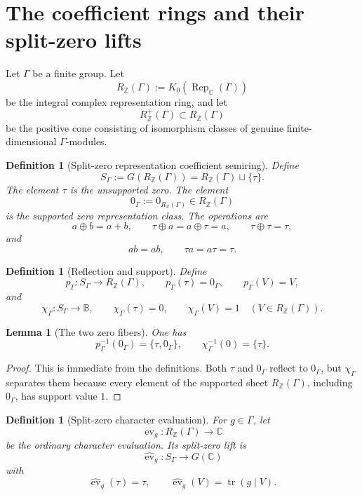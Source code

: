 \documentclass[11pt]{article}
\newtheorem{lemma}[theorem]{Lemma}
\newtheorem{definition}[theorem]{Definition}
\newcommand{\ZZ}{\mathbb Z}
\newcommand{\CC}{\mathbb C}
\newcommand{\BB}{\mathbb B}
\newcommand{\Rep}{\operatorname{Rep}}
\newcommand{\tr}{\operatorname{tr}}
\newcommand{\ev}{\operatorname{ev}}
\begin{document}
\section{The coefficient rings and their split-zero lifts}

Let \(\Gamma\) be a finite group.  Let
\[
R_\ZZ(\Gamma):=K_0(\Rep_\CC(\Gamma))
\]
be the integral complex representation ring, and let
\[
R_\ZZ^+(\Gamma)\subset R_\ZZ(\Gamma)
\]
be the positive cone consisting of isomorphism classes of genuine finite-dimensional \(\Gamma\)-modules.

\begin{definition}[Split-zero representation coefficient semiring]
Define
\[
S_\Gamma:=G(R_\ZZ(\Gamma))=R_\ZZ(\Gamma)\sqcup\{\tau\}.
\]
The element \(\tau\) is the unsupported zero.  The element
\[
0_\Gamma:=0_{R_\ZZ(\Gamma)}\in R_\ZZ(\Gamma)
\]
is the supported zero representation class.
The operations are
\[
a\oplus b=a+b,
\qquad
\tau\oplus a=a\oplus\tau=a,
\qquad
\tau\oplus\tau=\tau,
\]
and
\[
ab=ab,
\qquad
\tau a=a\tau=\tau.
\]
\end{definition}

\begin{definition}[Reflection and support]
Define
\[
p_\Gamma:S_\Gamma\to R_\ZZ(\Gamma),
\qquad
p_\Gamma(\tau)=0_\Gamma,
\qquad
p_\Gamma(V)=V,
\]
and
\[
\chi_\Gamma:S_\Gamma\to\BB,
\qquad
\chi_\Gamma(\tau)=0,
\qquad
\chi_\Gamma(V)=1\quad(V\in R_\ZZ(\Gamma)).
\]
\end{definition}

\begin{lemma}[The two zero fibers]
One has
\[
p_\Gamma^{-1}(0_\Gamma)=\{\tau,0_\Gamma\},
\qquad
\chi_\Gamma^{-1}(0)=\{\tau\}.
\]
\end{lemma}

\begin{proof}
This is immediate from the definitions.  Both \(\tau\) and \(0_\Gamma\) reflect to \(0_\Gamma\), but \(\chi_\Gamma\) separates them because every element of the supported sheet \(R_\ZZ(\Gamma)\), including \(0_\Gamma\), has support value \(1\).
\end{proof}

\begin{definition}[Split-zero character evaluation]
For \(g\in\Gamma\), let
\[
\ev_g:R_\ZZ(\Gamma)\to\CC
\]
be the ordinary character evaluation.  Its split-zero lift is
\[
\widehat{\ev}_g:S_\Gamma\to G(\CC)
\]
with
\[
\widehat{\ev}_g(\tau)=\tau,
\qquad
\widehat{\ev}_g(V)=\tr(g\mid V).
\]
\end{definition}
\end{document}
